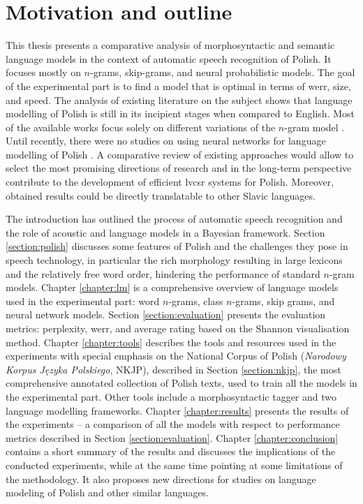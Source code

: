 \section{Motivation and outline}
\label{section:outline}
This thesis presents a comparative analysis of morphosyntactic and semantic language models in the context of automatic speech recognition of Polish. It focuses mostly on $n$-grams, skip-grams, and neural probabilistic models. The goal of the experimental part is to find a model that is optimal in terms of \gls{werr}, size, and speed. The analysis of existing literature on the subject shows that language modelling of Polish is still in its incipient stages when compared to English. Most of the available works focus solely on different variations of the $n$-gram model \cite{majewski2008syllable, ziolko2011n}. Until recently, there were no studies on using neural networks for language modelling of Polish \cite{gajecki2013modelowanie, brocki2012connectionist}. A comparative review of existing approaches would allow to select the most promising directions of research and in the long-term perspective contribute to the development of efficient \gls{lvcsr} systems for Polish. Moreover, obtained results could be directly translatable to other Slavic languages.

The introduction has outlined the process of automatic speech recognition and the role of acoustic and language models in a Bayesian framework. Section \ref{section:polish} discusses some features of Polish and the challenges they pose in speech technology, in particular the rich morphology resulting in large lexicons and the relatively free word order, hindering the performance of standard $n$-gram models. 
Chapter \ref{chapter:lm} is a comprehensive overview of language models used in the experimental part: word $n$-grams, class $n$-grams, skip grams, and neural network models. Section \ref{section:evaluation} presents the evaluation metrics: perplexity, \gls{werr}, and average rating based on the Shannon visualisation method.
Chapter \ref{chapter:tools} describes the tools and resources used in the experiments with special emphasis on the National Corpus of Polish (\textit{Narodowy Korpus Języka Polskiego}, NKJP), described in Section \ref{section:nkjp}, the most comprehensive annotated collection of Polish texts, used to train all the models in the experimental part. Other tools include a morphosyntactic tagger and two language modelling frameworks.
Chapter \ref{chapter:results} presents the results of the experiments -- a comparison of all the models with respect to performance metrics described in Section \ref{section:evaluation}.
Chapter \ref{chapter:conclusion} contains a short summary of the results and discusses the implications of the conducted experiments, while at the same time pointing at some limitations of the methodology. It also proposes new directions for studies on language modeling of Polish and other similar languages.
